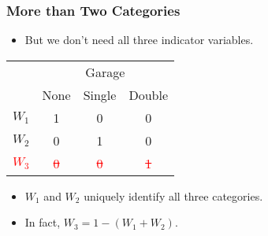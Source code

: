 \documentclass[14pt]{beamer}
\begin{document}
\begin{frame}
	\frametitle{More than Two Categories}
	
	\begin{itemize}[label={\color{blue}$\blacktriangleright$}]
		\item But we don't need all three indicator variables.
	\end{itemize}
	
	\begin{center}
		\begin{tabular}{cccc}
			\toprule
			& \multicolumn{3}{c}{Garage} \\
			\cline{2-4}
			& None & Single & Double \\
			\midrule
			$W_1$ & 1 & 0 & 0 \\
			$W_2$ & 0 & 1 & 0 \\
			\textcolor{red}{\sout{$W_3$}} & \textcolor{red}{\sout{0}} & \textcolor{red}{\sout{0}}&\textcolor{red}{\sout{1}} \\
			\bottomrule
		\end{tabular}

	\end{center}
	
	\begin{itemize}[label={\color{blue}$\blacktriangleright$}]
		\item $W_1$ and $W_2$ uniquely identify all three categories.
		
		\item In fact, $W_3 = 1 - (W_1 + W_2)$.
	\end{itemize}
	
\end{frame}
\end{document}
